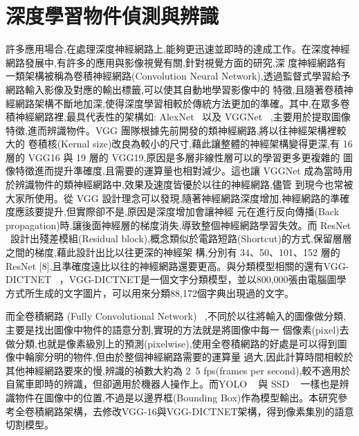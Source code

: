 \section{深度學習物件偵測與辨識}
許多應用場合,在處理深度神經網路上,能夠更迅速並即時的達成工作。在深度神經網路發展中,有許多的應用與影像視覺有關,針對視覺方面的研究,深
度神經網路有一類架構被稱為卷積神經網路(Convolution Neural Network),透過監督式學習給予網路輸入影像及對應的輸出標籤,可以使其自動地學習影像中的
特徵,且隨著卷積神經網路架構不斷地加深,使得深度學習相較於傳統方法更加的準確。其中,在眾多卷積神經網路裡,最具代表性的架構如: AlexNet ~\cite{krizhevsky2012imagenet}以及 VGGNet ~\cite{simonyan2014very},主要用於提取圖像特徵,進而辨識物件。VGG 團隊根據先前開發的類神經網路,將以往神經架構裡較大的
卷積核(Kernal size)改良為較小的尺寸,藉此讓整體的神經架構變得更深,有 16層的 VGG16 與 19 層的 VGG19,原因是多層非線性層可以的學習更多更複雜的
圖像特徵進而提升準確度,且需要的運算量也相對減少。這也讓 VGGNet 成為當時用於辨識物件的類神經網路中,效果及速度皆優於以往的神經網路,儘管
到現今也常被大家所使用。從 VGG 設計理念可以發現,隨著神經網路深度增加,神經網路的準確度應該要提升,但實際卻不是,原因是深度增加會讓神經
元在進行反向傳播(Back propagation)時,讓後面神經層的梯度消失,導致整個神經網路學習失效。而 ResNet ~\cite{he2016deep}設計出殘差模組(Residual block),概念類似於電路短路(Shortcut)的方式,保留層層之間的梯度,藉此設計出比以往更深的神經架
構,分別有 34、50、101、152 層的 ResNet [8],且準確度遠比以往的神經網路還要更高。與分類模型相關的還有VGG-DICTNET ~\cite{jaderberg2014deep
}，VGG-DICTNET是一個文字分類模型，並以800,000張由電腦圖學方式所生成的文字圖片，可以用來分類88,172個字典出現過的文字。

而全卷積網路 (Fully Convolutional Network) ~\cite{long2015fully},不同於以往將輸入的圖像做分類,主要是找出圖像中物件的語意分割,實現的方法就是將圖像中每一
個像素(pixel)去做分類,也就是像素級別上的預測(pixelwise),使用全卷積網路的好處是可以得到圖像中輪廓分明的物件,但由於整個神經網路需要的運算量
過大,因此計算時間相較於其他神經網路要來的慢,辨識的禎數大約為 2~5 fps(frames per second),較不適用於自駕車即時的辨識，但卻適用於機器人操作上。而YOLO ~\cite{redmon2017yolo9000} 與 SSD ~\cite{liu2016ssd} 一樣也是辨識物件在圖像中的位置,不過是以邊界框(Bounding Box)作為模型輸出。本研究參考全卷積網路架構，去修改VGG-16與VGG-DICTNET架構，得到像素集別的語意切割模型。

